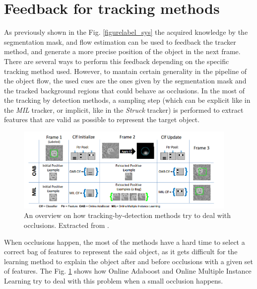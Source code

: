 \section{Feedback for tracking methods} \label{sec:feedback}

As previously shown in the Fig. \ref{figurelabel_sys} the acquired knowledge by the segmentation mask, and flow estimation can be used to 
feedback the tracker method, and generate a more precise position of the object in the next frame. There are several ways to perform this feedback 
depending on the specific tracking method used. However, to mantain certain generality in the pipeline of the object flow, the used cues are the ones 
given by the segmentation mask and the tracked background regions that could behave as occlusions. 
In the most of the tracking by detection methods, a sampling step (which can be explicit like in the {\it MIL} tracker, or implicit, 
like in the {\it Struck} tracker) is performed to extract features that are valid as possible to represent the target object. 

   \begin{figure}[thpb]
      \centering
      \includegraphics[width=0.95\textwidth]{../images/mil.png}
      \caption{An overview on how tracking-by-detection methods try to deal with occlusions. Extracted from \cite{c25}.}
      \label{tr_mil}
   \end{figure}
   
When occlusions happen, the most of the methods have a hard time to select a correct bag of features to represent the said object, as it gets difficult 
for the learning method to explain the object after and before occlusions with a given set of features. The Fig. \ref{tr_mil} shows how Online Adaboost 
and Online Multiple Instance Learning try to deal with this problem when a small occlusion happens.

